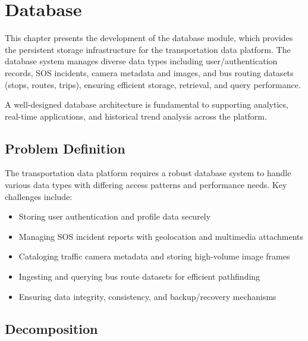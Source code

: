 \chapter{Database}
\label{chap:database}

This chapter presents the development of the database module, which provides the persistent storage infrastructure for the transportation data platform. The database system manages diverse data types including user/authentication records, SOS incidents, camera metadata and images, and bus routing datasets (stops, routes, trips), ensuring efficient storage, retrieval, and query performance.

A well-designed database architecture is fundamental to supporting analytics, real-time applications, and historical trend analysis across the platform.

\section{Problem Definition}
The transportation data platform requires a robust database system to handle various data types with differing access patterns and performance needs. Key challenges include:
\begin{itemize}
    \item Storing user authentication and profile data securely
    \item Managing SOS incident reports with geolocation and multimedia attachments
    \item Cataloging traffic camera metadata and storing high-volume image frames
    \item Ingesting and querying bus route datasets for efficient pathfinding
    \item Ensuring data integrity, consistency, and backup/recovery mechanisms
\end{itemize}

\section{Decomposition}

